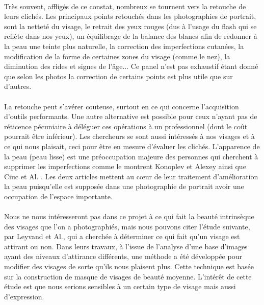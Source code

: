 \documentclass[11pt, french]{report-rd-info}
\begin{document}
\paragraph*{}
Très souvent, affligés de ce constat, nombreux se tournent vers la retouche de leurs clichés. Les principaux points retouchés dans les photographies de portrait, sont la netteté du visage, le retrait des yeux rouges (dus à l'usage du flash qui se reflète dans nos yeux), un équilibrage de la balance des blancs afin de redonner à la peau une teinte plus naturelle, la correction des imperfections cutanées, la modification de la forme de certaines zones du visage (comme le nez), la diminution des rides et signes de l'âge... Ce panel n'est pas exhaustif étant donné que selon les photos la correction de certains points est plus utile que sur d'autres.
\paragraph*{}
La retouche peut s'avérer couteuse, surtout en ce qui concerne l'acquisition d'outils performants. Une autre alternative est possible pour ceux n'ayant pas de réticence pécuniaire à déléguer ces opérations à un professionnel (dont le coût pourrait être inférieur). Les chercheurs se sont aussi intéressés à nos visages et à ce qui nous plaisait, ceci pour être en mesure d'évaluer les clichés. L’apparence de la peau (peau lisse) est une préoccupation majeure des personnes qui cherchent à supprimer les imperfections comme le montrent Konoplev et Alexey \cite{Konoplev2012} ainsi que Ciuc et Al. \cite{Ciuc2010}. Les deux articles mettent au cœur de leur traitement d'amélioration la peau puisqu'elle est supposée dans une photographie de portrait avoir une occupation de l'espace importante.
\paragraph*{}
Nous ne nous intéresseront pas dans ce projet à ce qui fait la beauté intrinsèque des visages que l'on a photographiés, mais nous pouvons citer l'étude suivante, par Leyvand et Al.\cite{Leyvand2008}, qui a cherchée à déterminer ce qui fait qu'un visage est attirant ou non. Dans leurs travaux, à l'issue de l'analyse d'une base d'images ayant des niveaux d'attirance différents,  une méthode a été développée pour modifier des visages de sorte qu'ils nous plaisent plus. Cette technique est basée sur la construction de masque de visages de beauté moyenne. L'intérêt de cette étude est que nous serions sensibles à un certain type de visage mais aussi d'expression.
\end{document}
